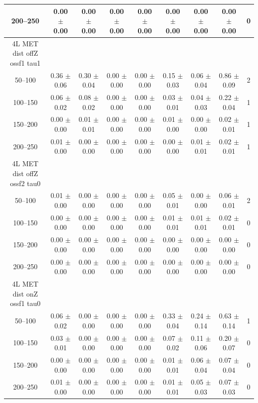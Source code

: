 \begin{table}
\begin{center}
\begin{tabular}{|c|cccccc|c|c|}
200--250 & 0.00 $\pm$ 0.00 & 0.00 $\pm$ 0.00 & 0.00 $\pm$ 0.00 & 0.00 $\pm$ 0.00 & 0.00 $\pm$ 0.00 & 0.00 $\pm$ 0.00 & 0.00 $\pm$ 0.00 & 0 \\
\hline
4L MET dist offZ ossf1 tau1\\
50--100 & 0.36 $\pm$ 0.06 & 0.30 $\pm$ 0.04 & 0.00 $\pm$ 0.00 & 0.00 $\pm$ 0.00 & 0.15 $\pm$ 0.03 & 0.06 $\pm$ 0.04 & 0.86 $\pm$ 0.09 & 2 \\
100--150 & 0.06 $\pm$ 0.02 & 0.08 $\pm$ 0.02 & 0.00 $\pm$ 0.00 & 0.00 $\pm$ 0.00 & 0.03 $\pm$ 0.01 & 0.04 $\pm$ 0.03 & 0.22 $\pm$ 0.04 & 1 \\
150--200 & 0.00 $\pm$ 0.00 & 0.01 $\pm$ 0.01 & 0.00 $\pm$ 0.00 & 0.00 $\pm$ 0.00 & 0.01 $\pm$ 0.00 & 0.00 $\pm$ 0.00 & 0.02 $\pm$ 0.01 & 1 \\
200--250 & 0.01 $\pm$ 0.00 & 0.00 $\pm$ 0.00 & 0.00 $\pm$ 0.00 & 0.00 $\pm$ 0.00 & 0.00 $\pm$ 0.00 & 0.01 $\pm$ 0.01 & 0.02 $\pm$ 0.01 & 1 \\
\hline
4L MET dist offZ ossf2 tau0\\
50--100 & 0.01 $\pm$ 0.00 & 0.00 $\pm$ 0.00 & 0.00 $\pm$ 0.00 & 0.00 $\pm$ 0.00 & 0.05 $\pm$ 0.01 & 0.00 $\pm$ 0.00 & 0.06 $\pm$ 0.01 & 2 \\
100--150 & 0.00 $\pm$ 0.00 & 0.00 $\pm$ 0.00 & 0.00 $\pm$ 0.00 & 0.00 $\pm$ 0.00 & 0.01 $\pm$ 0.01 & 0.01 $\pm$ 0.01 & 0.02 $\pm$ 0.01 & 0 \\
150--200 & 0.00 $\pm$ 0.00 & 0.00 $\pm$ 0.00 & 0.00 $\pm$ 0.00 & 0.00 $\pm$ 0.00 & 0.00 $\pm$ 0.00 & 0.00 $\pm$ 0.00 & 0.00 $\pm$ 0.00 & 0 \\
200--250 & 0.00 $\pm$ 0.00 & 0.00 $\pm$ 0.00 & 0.00 $\pm$ 0.00 & 0.00 $\pm$ 0.00 & 0.00 $\pm$ 0.00 & 0.00 $\pm$ 0.00 & 0.00 $\pm$ 0.00 & 0 \\
\hline
4L MET dist onZ ossf1 tau0\\
50--100 & 0.06 $\pm$ 0.02 & 0.00 $\pm$ 0.00 & 0.00 $\pm$ 0.00 & 0.00 $\pm$ 0.00 & 0.33 $\pm$ 0.04 & 0.24 $\pm$ 0.14 & 0.63 $\pm$ 0.14 & 1 \\
100--150 & 0.03 $\pm$ 0.01 & 0.00 $\pm$ 0.00 & 0.00 $\pm$ 0.00 & 0.00 $\pm$ 0.00 & 0.07 $\pm$ 0.02 & 0.11 $\pm$ 0.06 & 0.20 $\pm$ 0.07 & 0 \\
150--200 & 0.00 $\pm$ 0.00 & 0.00 $\pm$ 0.00 & 0.00 $\pm$ 0.00 & 0.00 $\pm$ 0.00 & 0.01 $\pm$ 0.01 & 0.06 $\pm$ 0.04 & 0.07 $\pm$ 0.04 & 0 \\
200--250 & 0.01 $\pm$ 0.00 & 0.00 $\pm$ 0.00 & 0.00 $\pm$ 0.00 & 0.00 $\pm$ 0.00 & 0.01 $\pm$ 0.01 & 0.05 $\pm$ 0.03 & 0.07 $\pm$ 0.03 & 0 \\
\hline

\end{tabular}
\end{center}
\end{table}

